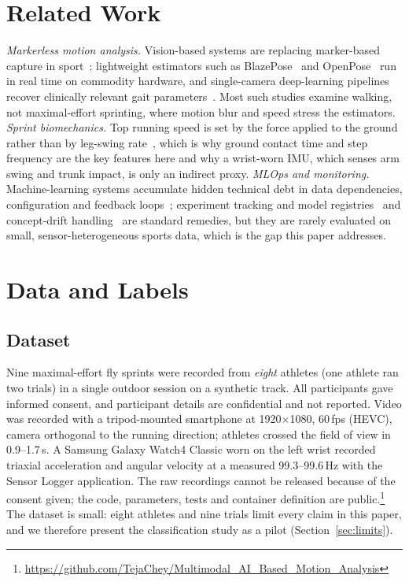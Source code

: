 \documentclass[conference]{IEEEtran}
\begin{document}
\section{Related Work}
\emph{Markerless motion analysis.} Vision-based systems are replacing marker-based capture in sport~\cite{colyer2018}; lightweight estimators such as BlazePose~\cite{bazarevsky2020} and OpenPose~\cite{cao2021} run in real time on commodity hardware, and single-camera deep-learning pipelines recover clinically relevant gait parameters~\cite{kidzinski2020}. Most such studies examine walking, not maximal-effort sprinting, where motion blur and speed stress the estimators.
\emph{Sprint biomechanics.} Top running speed is set by the force applied to the ground rather than by leg-swing rate~\cite{weyand2000}, which is why ground contact time and step frequency are the key features here and why a wrist-worn IMU, which senses arm swing and trunk impact, is only an indirect proxy.
\emph{MLOps and monitoring.} Machine-learning systems accumulate hidden technical debt in data dependencies, configuration and feedback loops~\cite{sculley2015}; experiment tracking and model registries~\cite{zaharia2018} and concept-drift handling~\cite{gama2014} are standard remedies, but they are rarely evaluated on small, sensor-heterogeneous sports data, which is the gap this paper addresses.

\section{Data and Labels}\label{sec:data}
\subsection{Dataset}
Nine maximal-effort fly sprints were recorded from \emph{eight} athletes (one athlete ran two trials) in a single outdoor session on a synthetic track. All participants gave informed consent, and participant details are confidential and not reported. Video was recorded with a tripod-mounted smartphone at 1920$\times$1080, 60\,fps (HEVC), camera orthogonal to the running direction; athletes crossed the field of view in 0.9--1.7\,s. A Samsung Galaxy Watch4 Classic worn on the left wrist recorded triaxial acceleration and angular velocity at a measured 99.3--99.6\,Hz with the Sensor Logger application. The raw recordings cannot be released because of the consent given; the code, parameters, tests and container definition are public.\footnote{\url{https://github.com/TejaChey/Multimodal_AI_Based_Motion_Analysis}}
The dataset is small: eight athletes and nine trials limit every claim in this paper, and we therefore present the classification study as a pilot (Section~\ref{sec:limits}).
\end{document}
